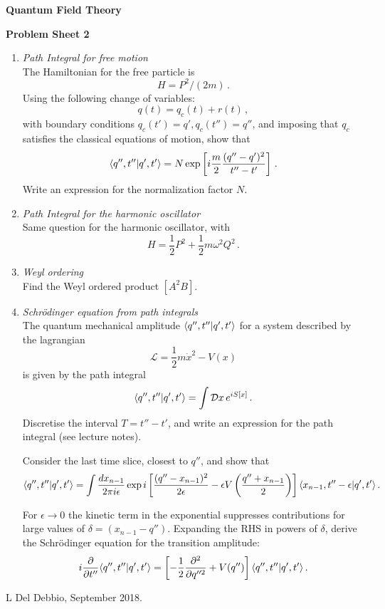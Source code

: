 \documentclass[12pt,a4paper]{article}
\begin{document}
\begin{center}
{\bf Quantum Field Theory}\\[\baselineskip]
\end{center}
{\bf Problem Sheet 2}

\begin{enumerate}
  \item {\it Path Integral for free motion}\\

    The Hamiltonian for the free particle is 
    \[
      H = P^2/(2m)\, .
    \]
    Using the following change of variables:
    \[
      q(t) = q_c(t) + r(t)\, ,
    \]
    with boundary conditions $q_c(t')=q', q_c(t'')=q''$, and imposing
    that $q_c$ satisfies the classical equations of motion, show that
    \[
      \langle q'',t'' | q',t' \rangle=N \exp\left[i \frac{m}{2}
        \frac{(q''-q')^2}{t''-t'}\right]\, .
    \]
    Write an expression for the normalization factor $N$. 

    \bigskip

  \item {\it Path Integral for the harmonic oscillator} \\

    Same question for the harmonic oscillator, with 
    \[
      H = \frac12 P^2 + \frac12 m \omega^2 Q^2\, .
    \]

    \bigskip

  \item {\it Weyl ordering}\\

    Find the Weyl ordered product $[A^2 B]$.

    \bigskip

  \item {\it Schr\"odinger equation from path integrals}\\
    
    The quantum mechanical amplitude $\langle q'',t'' | q',t' \rangle$ for a
    system described by the lagrangian
    \[
      \mathcal{L} = \frac12 m \dot{x}^2 - V(x)
    \]
    is given by the path integral
    \[
      \langle q'',t'' | q',t' \rangle = \int \mathcal{D}x\, e^{i S[x]}\, .
    \]
    Discretise the interval $T=t''-t'$, and write an expression for
    the path integral (see lecture notes). 
    
    Consider the last time slice, closest to $q''$, and show that
    \[
      \langle q'',t'' | q',t' \rangle = \int \frac{dx_{n-1}}{2\pi i \epsilon} 
      \exp i \left[ 
        \frac{(q''-x_{n-1})^2}{2\epsilon} - \epsilon V\left(\frac{q''+x_{n-1}}{2}\right)
      \right]
       \langle x_{n-1},t''-\epsilon | q',t' \rangle\, .
    \]
    
    For $\epsilon\to 0$ the kinetic term in the exponential suppresses
    contributions for large values of $\delta=(x_{n-1}-q'')$. Expanding the
    RHS in powers of $\delta$, derive the Schr\"odinger equation for
    the transition amplitude: 
    \[
      i \frac{\partial}{\partial t''} \langle q'',t'' | q',t' \rangle = 
      \left[-\frac12 \frac{\partial^2}{\partial q''^2} + V(q'') \right]
      \langle q'',t'' | q',t' \rangle\, .
    \]
    
    
\end{enumerate}

\vfill
\hspace*{\fill}\tiny L Del Debbio, September 2018.
\end{document}
